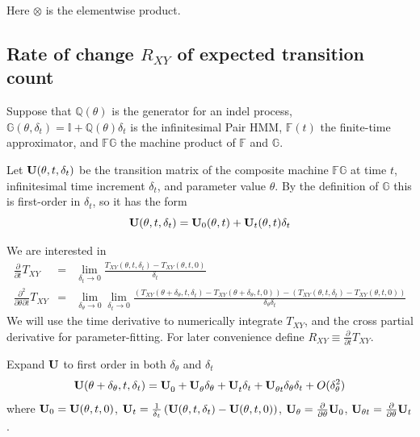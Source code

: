 \documentclass{article}
\begin{document}
Here $\otimes$ is the elementwise product.



\subsection{Rate of change $R_{XY}$ of expected transition count}

Suppose that
$\mathbb{Q}(\theta)$ is the generator for an indel process,
$\mathbb{G}(\theta,\delta_t) = \mathbb{I} + \mathbb{Q}(\theta) \delta_t$ is the infinitesimal Pair HMM,
$\mathbb{F}(t)$ the finite-time approximator,
and $\mathbb{FG}$ the machine product of $\mathbb{F}$ and $\mathbb{G}$.

Let ${\bf U}(\theta,t,\delta_t)$ be the transition matrix
of the composite machine $\mathbb{FG}$
at time $t$, infinitesimal time increment $\delta_t$, and parameter value $\theta$.
By the definition of $\mathbb{G}$ this is first-order in $\delta_t$, so it has the form
\[
  {\bf U}(\theta,t,\delta_t) = {\bf U}_0(\theta,t) + {\bf U}_t(\theta,t) \delta_t
  \]

We are interested in
\begin{eqnarray*}
\frac{\partial}{\partial t}T_{XY} & = & \lim_{\delta_t \to 0} \frac{T_{XY}(\theta,t,\delta_t) - T_{XY}(\theta,t,0)}{\delta_t} \\
\frac{\partial^2}{\partial \theta \partial t}T_{XY} & = & \lim_{\delta_\theta \to 0} \lim_{\delta_t \to 0}
\frac{\left(T_{XY}(\theta+\delta_\theta,t,\delta_t) - T_{XY}(\theta+\delta_\theta,t,0)\right) - \left(T_{XY}(\theta,t,\delta_t) - T_{XY}(\theta,t,0)\right)}{\delta_\theta \delta_t}
\end{eqnarray*}
We will use the time derivative to numerically integrate $T_{XY}$, and the cross partial derivative for parameter-fitting.
For later convenience define $R_{XY} \equiv \frac{\partial}{\partial t} T_{XY}$.

Expand ${\bf U}$ to first order in both $\delta_\theta$ and $\delta_t$
\newcommand\tthetaexpansion[2]{  {#2}_0^{#1}
  + {#2}_\theta^{#1} \delta_\theta
  + {#2}_t^{#1} \delta_t
  + {#2}_{\theta t}^{#1} \delta_\theta \delta_t }
\newcommand\uexpansion{\tthetaexpansion{}{\bf U}}
\newcommand\vexpansion[1]{\tthetaexpansion{#1}{\bf V}}
\[
  {\bf U}(\theta+\delta_\theta,t,\delta_t) = \uexpansion + O(\delta_\theta^2) %
\]
where ${\bf U}_0={\bf U}(\theta,t,0)$,
${\bf U}_t=\frac{1}{\delta_t} \left( {\bf U}(\theta,t,\delta_t) - {\bf U}(\theta,t,0) \right)$,
${\bf U}_\theta=\frac{\partial}{\partial \theta} {\bf U}_0$,
${\bf U}_{\theta t}=\frac{\partial}{\partial \theta}  {\bf U}_t$.
\end{document}
